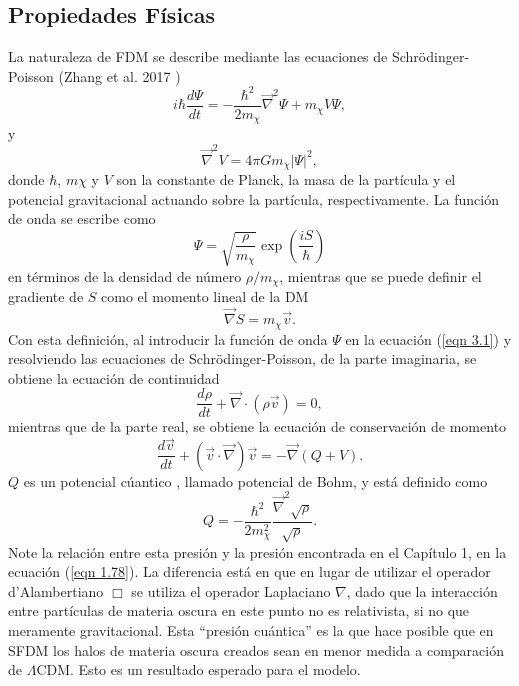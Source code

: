 \documentclass[a4paper,openright,12pt]{book}
\begin{document}
\subsection{Propiedades Físicas}
La naturaleza de FDM se describe mediante las ecuaciones de Schrödinger-Poisson (Zhang et al. 2017 \cite{3.1})
\begin{equation}
i\hbar \frac{d \Psi}{dt} 
=
-\frac{\hbar^{2}}{2m_{\chi}} \vec{\nabla}^{2}\Psi + m_{\chi}V\Psi,\label{eqn 3.1}
\end{equation}
y
\begin{equation}
\vec{\nabla}^{2}V = 4\pi G m_{\chi}|\Psi|^{2},\label{eqn 3.2}
\end{equation}
donde $\hbar$, $m\chi$ y $V$ son la constante de Planck, la masa de la partícula y el potencial gravitacional actuando sobre la partícula, respectivamente. La función de onda se escribe como
\begin{equation}
\Psi = \sqrt{\frac{\rho}{m_{\chi}}}\exp(\frac{iS}{\hbar})\label{eqn 3.3}
\end{equation}
en términos de la densidad de número $\rho/m_{\chi}$, mientras que se puede definir el gradiente de $S$ como el momento lineal de la DM
\begin{equation}
\vec{\nabla}S = m_{\chi}\vec{v}.\label{eqn 3.4}
\end{equation}
Con esta definición, al introducir la función de onda $\Psi$ en la ecuación (\ref{eqn 3.1}) y resolviendo las ecuaciones de Schrödinger-Poisson, de la parte imaginaria, se obtiene la ecuación de continuidad
\begin{equation}
\frac{d\rho}{dt} + \vec{\nabla}\cdot(\rho\vec{v}) = 0,\label{eqn 3.5}
\end{equation}
mientras que de la parte real, se obtiene la ecuación de conservación de momento
\begin{equation}
\frac{d\vec{v}}{dt} + (\vec{v}\cdot\vec{\nabla})\vec{v} 
=
-\vec{\nabla}(Q + V).\label{eqn 3.6}
\end{equation}
$Q$ es un potencial cúantico , llamado potencial de Bohm, y está definido como
\begin{equation}
Q 
=
-\frac{\hbar^{2}}{2m^{2}_{\chi}}\frac{\vec{\nabla}^{2}\sqrt{\rho}}{\sqrt{\rho}}.\label{eqn 3.7}
\end{equation}
Note la relación entre esta presión y la presión encontrada en el Capítulo 1, en la ecuación (\ref{eqn 1.78}). La diferencia está en que en lugar de utilizar el operador d'Alambertiano $\Box$ se utiliza el operador Laplaciano $\nabla$, dado que la interacción entre partículas de materia oscura en este punto no es relativista, si no que meramente gravitacional. Esta ``presión cuántica'' es la que hace posible que en SFDM los halos de materia oscura creados sean en menor medida a comparación de $\Lambda$CDM. Esto es un resultado esperado para el modelo.
\end{document}
